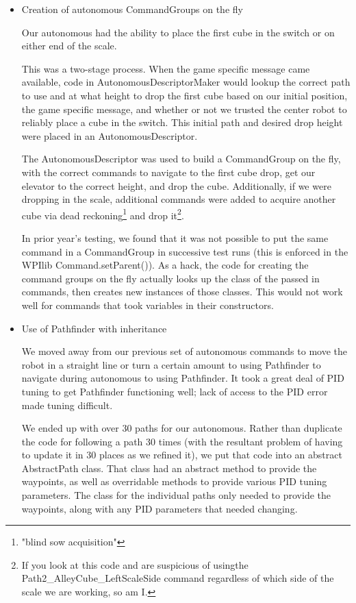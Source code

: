 \documentclass[]{article}
\begin{document}
\begin{itemize}[topsep=0pt]

\item {Creation of autonomous CommandGroups on the fly}

Our autonomous had the ability to place the first cube in the switch or on either end of the scale.

This was a two-stage process. When the game specific message came available, code in AutonomousDescriptorMaker would lookup the correct path to use and at what height to drop the first cube based on our initial position, the game specific message, and whether or not we trusted the center robot to reliably place a cube in the switch. This initial path and desired drop height were placed in an AutonomousDescriptor.

The AutonomousDescriptor was used to build a CommandGroup on the fly, with the correct commands to navigate to the first cube drop, get our elevator to the correct height, and drop the cube. Additionally, if we were dropping in the scale, additional commands were added to acquire another cube via dead reckoning\footnote {
	"blind sow acquisition"
} and drop it\footnote {
If you look at this code and are suspicious of usingthe Path2\_AlleyCube\_LeftScaleSide command regardless of which side of the scale we are working, so am I.}.

In prior year's testing, we found that it was not possible to put the same command in a CommandGroup in successive test runs (this is enforced in the WPIlib Command.setParent()). As a hack, the code for creating the command groups on the fly actually looks up the class of the passed in commands, then creates new instances of those classes. This would not work well for commands that took variables in their constructors. 

\item Use of Pathfinder with inheritance

We moved away from our previous set of autonomous commands to move the robot in a straight line or turn a certain amount to using Pathfinder to navigate during autonomous to using Pathfinder. It took a great deal of PID tuning to get Pathfinder functioning well; lack of access to the PID error made tuning difficult.

We ended up with over 30 paths for our autonomous. Rather than duplicate the code for following a path 30 times (with the resultant problem of having to update it in 30 places as we refined it), we put that code into an abstract AbstractPath class. That class had an abstract method to provide the waypoints, as well as overridable methods to provide various PID tuning parameters. The class for the individual paths only needed to provide the waypoints, along with any PID parameters that needed changing.


\end{itemize}
\end{document}
